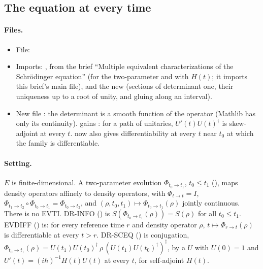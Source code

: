 \documentclass[11pt]{article}
\begin{document}
\subsection{The equation at every time}\label{sec:unitary-entropy-every-time}

\paragraph{Files.}\leavevmode
\begin{itemize}
\item File: 
\item Imports: , from the brief ``Multiple equivalent
  characterizations of the Schr\"odinger equation'' (for the two-parameter  and
   with $H(t)$; it imports this brief's main file), and the new
   (sections of determinant one, their
  uniqueness up to a root of unity, and gluing along an interval).
\item New  file :
  the determinant is a smooth function of the operator (Mathlib has only its continuity).
   gains
  : for a path of unitaries,
  $U'(t)U(t)^\dagger$ is skew-adjoint at every $t$. 
  now also gives differentiability at every $t$ near $t_0$ at which the family is differentiable.
\end{itemize}

\paragraph{Setting.} $E$ is finite-dimensional. A two-parameter evolution $\Phi_{t_0\to t_1}$,
$t_0 \le t_1$ (), maps density operators affinely to density operators, with
$\Phi_{t\to t} = I$, $\Phi_{t_1\to t_2}\circ\Phi_{t_0\to t_1} = \Phi_{t_0\to t_2}$, and
$(\rho, t_0, t_1) \mapsto \Phi_{t_0\to t_1}(\rho)$ jointly continuous. There is no EVTI. DR-INFO
() is $S(\Phi_{t_0\to t_1}(\rho)) = S(\rho)$ for all $t_0 \le t_1$. EVDIFF
() is: for every reference time $r$ and density operator $\rho$,
$t \mapsto \Phi_{r\to t}(\rho)$ is differentiable at every $t > r$. DR-SCEQ () is
conjugation, $\Phi_{t_0\to t_1}(\rho) = U(t_1)U(t_0)^\dagger\,\rho\,(U(t_1)U(t_0)^\dagger)^\dagger$, by
a $U$ with $U(0) = 1$ and $U'(t) = (i\hbar)^{-1}H(t)U(t)$ at every $t$, for self-adjoint $H(t)$.
\end{document}
